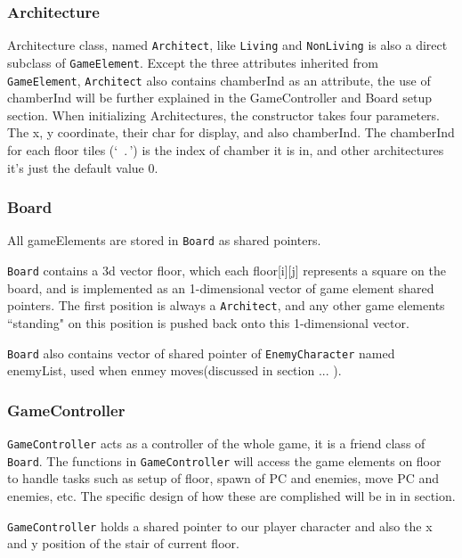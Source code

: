 \documentclass[11pt]{article}
\theoremstyle{plain} \newtheorem{theorem*}{Theorem}[subsection]
\begin{document}
\subsubsection{Architecture}

Architecture class, named \texttt{Architect}, like \texttt{Living} and
\texttt{NonLiving} is also a direct subclass of \texttt{GameElement}. 
Except the three attributes inherited from \texttt{GameElement}, 
\texttt{Architect} also contains \textsf{chamberInd} as an attribute, 
the use of \textsf{chamberInd} will be further explained in the GameController
and Board setup section.
When initializing Architectures, the constructor takes four parameters.
The x, y coordinate, their char for display, and also \textsf{chamberInd}.
The \textsf{chamberInd} for each floor tiles (`\ .\,') is the index of chamber
it is in, and other architectures it's just the default value $0$.

\subsubsection{Board}

All gameElements are stored in \texttt{Board} as shared pointers. 

\texttt{Board} contains a 3d vector \textsf{floor}, which each
\textsf{floor[i][j]} represents a square on the board, and is implemented 
as an 1-dimensional vector of game element shared pointers.
The first position is always a \texttt{Architect}, and any other game elements
``standing" on this position is pushed back onto this 1-dimensional vector.

\texttt{Board} also contains vector of shared pointer of \texttt{EnemyCharacter}
named \textsf{enemyList}, {\color{red}
used when enmey moves(discussed in section ... ).}



\subsubsection{GameController}

\texttt{GameController} acts as a controller of the whole game, it is a 
friend class of \texttt{Board}. The functions in \texttt{GameController}
will access the game elements on \textsf{floor} to handle tasks such as
setup of \textsf{floor}, spawn of PC and enemies, move PC and enemies, etc.
The specific design of how these are complished will be in
{\color{red} in section}.

\texttt{GameController} holds a shared pointer to our player character
and also the x and y position of the stair of current floor.
\end{document}
